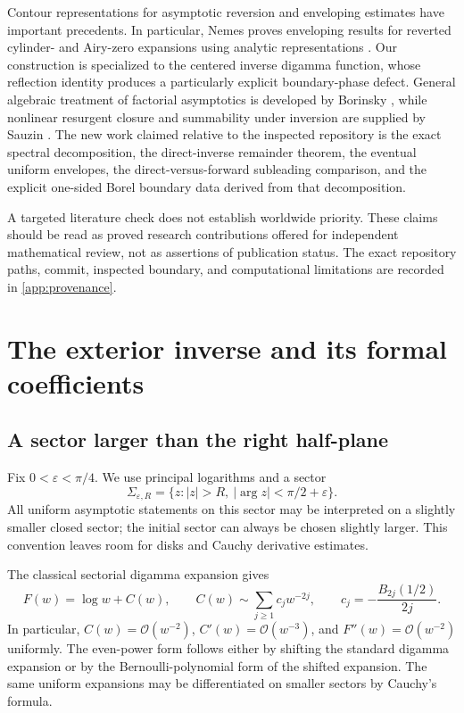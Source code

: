 \documentclass[11pt,a4paper]{article}
\theoremstyle{definition}
\numberwithin{equation}{section}
\newcommand{\Oh}{\mathcal O}
\begin{document}
Contour representations for asymptotic reversion and enveloping estimates have important precedents. In particular, Nemes proves enveloping results for reverted cylinder- and Airy-zero expansions using analytic representations \cite{nemes}. Our construction is specialized to the centered inverse digamma function, whose reflection identity produces a particularly explicit boundary-phase defect. General algebraic treatment of factorial asymptotics is developed by Borinsky \cite{borinsky}, while nonlinear resurgent closure and summability under inversion are supplied by Sauzin \cite{sauzin}. The new work claimed relative to the inspected repository is the exact spectral decomposition, the direct-inverse remainder theorem, the eventual uniform envelopes, the direct-versus-forward subleading comparison, and the explicit one-sided Borel boundary data derived from that decomposition.

A targeted literature check does not establish worldwide priority. These claims should be read as proved research contributions offered for independent mathematical review, not as assertions of publication status. The exact repository paths, commit, inspected boundary, and computational limitations are recorded in \cref{app:provenance}.

\section{The exterior inverse and its formal coefficients}
\label{sec:inverse}

\subsection{A sector larger than the right half-plane}
Fix $0<\varepsilon<\pi/4$. We use principal logarithms and a sector
\[
 \Sigma_{\varepsilon,R}
 =\{z:|z|>R,\ |\arg z|<\pi/2+\varepsilon\}.
\]
All uniform asymptotic statements on this sector may be interpreted on a slightly smaller closed sector; the initial sector can always be chosen slightly larger. This convention leaves room for disks and Cauchy derivative estimates.

The classical sectorial digamma expansion \cite[\S5.11]{dlmf} gives
\begin{equation}
 F(w)=\log w+C(w),\qquad
 C(w)\sim\sum_{j\ge1}c_jw^{-2j},\qquad
 c_j=-\frac{B_{2j}(1/2)}{2j}.
 \label{eq:centered}
\end{equation}
In particular, $C(w)=\Oh(w^{-2})$, $C'(w)=\Oh(w^{-3})$, and
$F''(w)=\Oh(w^{-2})$ uniformly. The even-power form follows either by shifting the standard digamma expansion or by the Bernoulli-polynomial form of the shifted expansion. The same uniform expansions may be differentiated on smaller sectors by Cauchy's formula.
\end{document}

